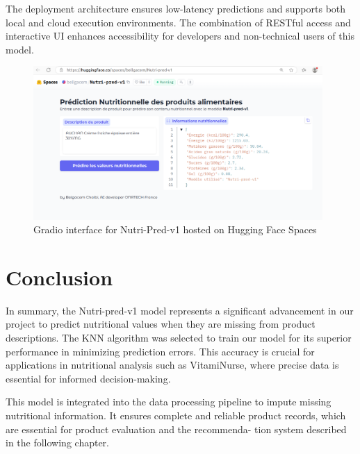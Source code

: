 \vspace{1cm}
The deployment architecture ensures low-latency predictions and supports both local and cloud execution environments. The combination of RESTful access and interactive UI enhances accessibility for developers and non-technical users of this model.

\begin{figure}[H]
    \centering
    \includegraphics[width=0.98\textwidth]{images/Nutri-pred_Huggingface.png}
    \caption{Gradio interface for Nutri-Pred-v1 hosted on Hugging Face Spaces}
    \label{fig:gradio-ui}
\end{figure}

\section{Conclusion}
\par In summary, the Nutri-pred-v1 model represents a significant advancement in our project to predict nutritional values when they are missing
from product descriptions. The KNN algorithm was selected to train
our model for its superior performance in minimizing prediction errors.
This accuracy is crucial for applications in nutritional analysis such as
VitamiNurse, where precise data is essential for informed decision-making.
\par This model is integrated into the data processing pipeline to impute
missing nutritional information. It ensures complete and reliable product
records, which are essential for product evaluation and the recommenda-
tion system described in the following chapter.